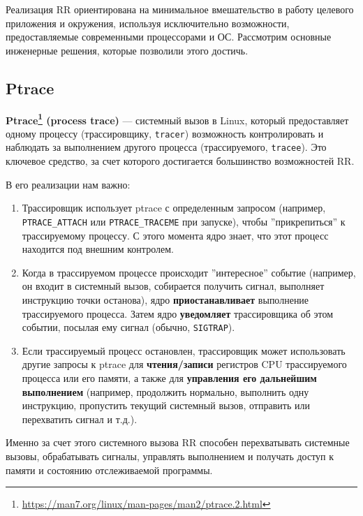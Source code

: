 Реализация RR ориентирована на минимальное вмешательство в работу целевого
приложения и окружения, используя исключительно возможности, предоставляемые
современными процессорами и ОС. Рассмотрим основные инженерные решения, которые позволили этого достичь.

\subsection{Ptrace}

\textbf{Ptrace\footnote{\url{https://man7.org/linux/man-pages/man2/ptrace.2.html}}
(process trace)} — системный вызов в Linux, который предоставляет одному
процессу (трассировщику, \texttt{tracer}) возможность контролировать и наблюдать за
выполнением другого процесса (трассируемого, \texttt{tracee}). Это ключевое средство,
за счет которого достигается большинство возможностей RR.

В его реализации нам важно:

\begin{enumerate}

  \item Трассировщик использует ptrace с определенным запросом (например,
  \texttt{PTRACE\_ATTACH} или \texttt{PTRACE\_TRACEME} при запуске), чтобы
  ''прикрепиться'' к трассируемому процессу. С этого момента ядро знает, что
  этот процесс находится под внешним контролем.

  \item Когда в трассируемом процессе происходит ''интересное'' событие
  (например, он входит в системный вызов, собирается получить сигнал, выполняет
  инструкцию точки останова), ядро \textbf{приостанавливает} выполнение
  трассируемого процесса. Затем ядро \textbf{уведомляет} трассировщика об этом
  событии, посылая ему сигнал (обычно, \texttt{SIGTRAP}).

  \item Если трассируемый процесс остановлен, трассировщик может использовать
  другие запросы к ptrace для \textbf{чтения/записи} регистров CPU трассируемого
  процесса или его памяти, а также для \textbf{управления его дальнейшим выполнением}
  (например, продолжить нормально, выполнить одну инструкцию, пропустить
  текущий системный вызов, отправить или перехватить сигнал и т.д.).

\end{enumerate}

Именно за счет этого системного вызова RR способен перехватывать системные
вызовы, обрабатывать сигналы, управлять выполнением и получать доступ к памяти и
состоянию отслеживаемой программы.

